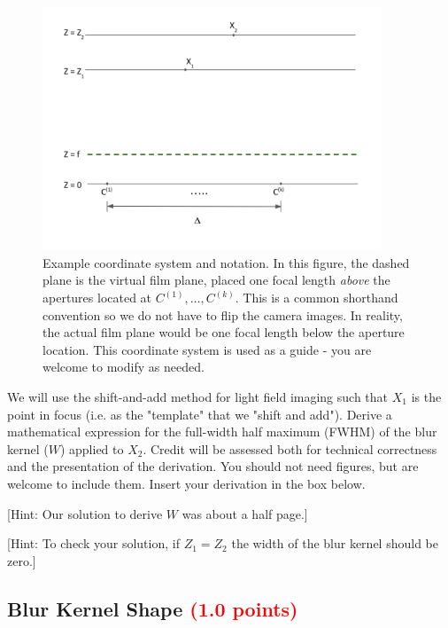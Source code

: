 \documentclass[answers]{exam}
\newcommand{\mypoints}[1]{\textcolor{red}{(#1 points)}}
\begin{document}
\begin{figure}[h]
\centering

    \includegraphics[width=0.9\textwidth]{pset_assesment.png}
    \caption{Example coordinate system and notation. In this figure, the dashed plane is the virtual film plane, placed one focal length \emph{above} the apertures located at $C^{(1)},\ldots,C^{(k)}$. This is a common shorthand convention so we do not have to flip the camera images. In reality, the actual film plane would be one focal length below the aperture location. This coordinate system is used as a guide - you are welcome to modify as needed.} 
    \label{assesment}
\end{figure}


We will use the shift-and-add method for light field imaging such that $X_1$ is the point in focus (i.e. as the "template" that we "shift and add"). Derive a mathematical expression for the full-width half maximum (FWHM) of the blur kernel ($W$) applied to $X_2$. Credit will be assessed both for technical correctness and the presentation of the derivation. You should not need figures, but are welcome to include them. Insert your derivation in the box below. 

[Hint: Our solution to derive $W$ was about a half page.]

[Hint: To check your solution, if $Z_1 = Z_2$ the width of the blur kernel should be zero.]



    \begin{solution}
    \vspace{20cm} %
    \end{solution}

\subsection{Blur Kernel Shape \mypoints{1.0}} \label{sssec:kernelshape}
\end{document}
